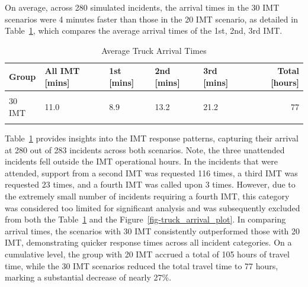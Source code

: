 \documentclass[fancy, oneside, mastersfancy, ms]{byuthesis}
\begin{document}
On average, across 280 simulated incidents, the arrival times in the 30
IMT scenarios were 4 minutes faster than those in the 20 IMT scenario,
as detailed in Table~\ref{tbl-truck_arrival_table}, which compares the
average arrival times of the 1st, 2nd, 3rd IMT.

\hypertarget{tbl-truck_arrival_table}{}
\begin{table}
\caption{\label{tbl-truck_arrival_table}Average Truck Arrival Times }\tabularnewline

\centering
\begin{tabular}[t]{lllllr}
\toprule
\textbf{Group} & \textbf{All IMT [mins]} & \textbf{1st [mins]} & \textbf{2nd [mins]} & \textbf{3rd [mins]} & \textbf{Total [hours]}\\
\midrule
\cellcolor{gray!6}{20 IMT} & \cellcolor{gray!6}{15.0} & \cellcolor{gray!6}{11.1} & \cellcolor{gray!6}{21.1} & \cellcolor{gray!6}{28.9} & \cellcolor{gray!6}{105}\\
30 IMT & 11.0 & 8.9 & 13.2 & 21.2 & 77\\
\cellcolor{gray65}{\cellcolor{gray!6}{Incidents}} & \cellcolor{gray65}{\cellcolor{gray!6}{280}} & \cellcolor{gray65}{\cellcolor{gray!6}{280}} & \cellcolor{gray65}{\cellcolor{gray!6}{116}} & \cellcolor{gray65}{\cellcolor{gray!6}{23}} & \cellcolor{gray65}{\cellcolor{gray!6}{280}}\\
\bottomrule
\end{tabular}
\end{table}

Table~\ref{tbl-truck_arrival_table} provides insights into the IMT
response patterns, capturing their arrival at 280 out of 283 incidents
across both scenarios. Note, the three unattended incidents fell outside
the IMT operational hours. In the incidents that were attended, support
from a second IMT was requested 116 times, a third IMT was requested 23
times, and a fourth IMT was called upon 3 times. However, due to the
extremely small number of incidents requiring a fourth IMT, this
category was considered too limited for significant analysis and was
subsequently excluded from both the Table~\ref{tbl-truck_arrival_table}
and the Figure~\ref{fig-truck_arrival_plot}. In comparing arrival times,
the scenarios with 30 IMT consistently outperformed those with 20 IMT,
demonstrating quicker response times across all incident categories. On
a cumulative level, the group with 20 IMT accrued a total of 105 hours
of travel time, while the 30 IMT scenarios reduced the total travel time
to 77 hours, marking a substantial decrease of nearly 27\%.
\end{document}
